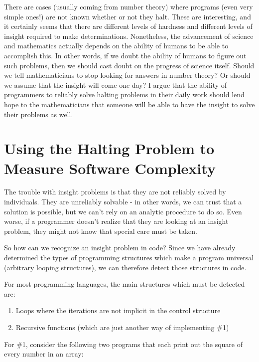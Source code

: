 There are cases (usually coming from number theory) where programs (even very simple ones!) are not known whether or not they halt.  These are interesting, and it certainly seems that there are different levels of hardness and different levels of insight required to make determinations.  Nonetheless, the advancement of science and mathematics actually depends on the ability of humans to be able to accomplish this.  In other words, if we doubt the ability of humans to figure out such problems, then we should cast doubt on the progress of science itself.  Should we tell mathematicians to stop looking for answers in number theory?   Or should we assume that the insight will come one day?  I argue that the ability of programmers to reliably solve halting problems in their daily work should lend hope to the mathematicians that someone will be able to have the insight to solve their problems as well.

\section{Using the Halting Problem to Measure Software Complexity}

The trouble with insight problems is that they are not reliably solved by individuals.  They are unreliably solvable - in other words, we can trust that a solution is possible, but we can't rely on an analytic procedure to do so.  Even worse, if a programmer doesn't realize that they are looking at an insight problem, they might not know that special care must be taken.

So how can we recognize an insight problem in code?  Since we have already determined the types of programming structures which make a program universal (arbitrary looping structures), we can therefore detect those structures in code.

For most programming languages, the main structures which must be detected are:

\begin{enumerate}
\item Loops where the iterations are not implicit in the control structure
\item Recursive functions (which are just another way of implementing \#1)
\end{enumerate}

For \#1, consider the following two programs that each print out the square of every number in an array:

